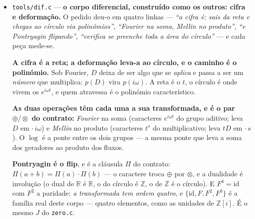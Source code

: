 \documentclass[11pt]{article}
\newcommand{\code}[1]{\texttt{\small #1}}
\newcommand{\Z}{\mathbb Z}
\newcommand{\R}{\mathbb R}
\newcommand{\Q}{\mathbb Q}
\theoremstyle{plain}
\theoremstyle{remark}
\begin{document}
\begin{itemize}
\textbf{E a ordem vive na interseção.} Nenhum dos dois se ordena, e agora pela \emph{mesma} razão:
os elementos puros têm quadrado negativo nos dois. A ordem total e compatível com $+$ e $\times$
só sobrevive na parte real --- e os elementos puros, onde o quadrado é negativo, são exatamente os
que a orientação distingue. \emph{Ordenar é ficar onde as duas mãos concordam.}

\textbf{A completude}, pelas duas caracterizações clássicas: a cifra é de Cauchy e converge com a
taxa $\sigma^{-2k}$ (e o ouro é o \emph{mais lento} --- é o mais irracional, e um limiar fixo
puni-lo-ia por isso), e o corte $\{x\in\Q:x^2<2\}$ tem fronteira. \textbf{E as outras construções
dos reais}: Dedekind (cortes, dá o supremo), Cantor--Méray (Cauchy, dá o limite), Weierstrass,
Bachmann, Conway. A nossa é por frações contínuas, e o que acrescenta mede-se: os convergentes são
as \emph{melhores} aproximações racionais (Lagrange). \emph{As outras dão o ponto; esta dá o ponto
com o caminho ótimo até ele, e o caminho é o gato.}

\item \code{tools/dif.c} --- \textbf{o corpo diferencial, construído como os outros: cifra e
deformação.} O pedido deu-o em quatro linhas --- \emph{``a cifra é: sais da reta e chegas ao
círculo via polinómios''}, \emph{``Fourier na soma, Mellin no produto''}, \emph{``e Pontryagin
flipando''}, \emph{``verifica se preenche toda a área do círculo''} --- e cada peça mede-se.

\textbf{A cifra é a reta; a deformação leva-a ao círculo, e o caminho é o polinómio.} Sob
Fourier, $D$ deixa de ser algo que se \emph{aplica} e passa a ser um \emph{número} que multiplica:
$p(D)$ vira $p(i\omega)$. A reta é o $t$, o círculo é onde vivem os $e^{i\omega t}$, e quem
atravessa é o polinómio característico.

\textbf{As duas operações têm cada uma a sua transformada, e é o par $\oplus/\otimes$ do
contrato:} \emph{Fourier} na soma (caracteres $e^{i\omega t}$ do grupo aditivo; leva $D$ em
$\cdot\,i\omega$) e \emph{Mellin} no produto (caracteres $t^s$ do multiplicativo; leva $tD$ em
$\cdot\,s$). O $\log$ é a ponte entre os dois grupos --- a mesma ponte que leva a soma dos
geradores ao produto dos fluxos.

\textbf{Pontryagin é o flip}, e é a cláusula $\Pi$ do contrato: $\Pi(a+b)=\Pi(a)\cdot\Pi(b)$ ---
o caractere troca $\oplus$ por $\otimes$, e a dualidade é involução (o dual de $\R$ é $\R$, o do
círculo é $\Z$, o de $\Z$ é o círculo). E $F^4=\mathrm{id}$ com $F^2$ a paridade: \emph{a
transformada tem ordem quatro}, e $\{ \mathrm{id},F,F^2,F^3\}$ é a família real deste corpo ---
quatro elementos, como as unidades de $\Z[i]$. É o mesmo $J$ do \code{zero.c}.


\end{itemize}
\end{document}
